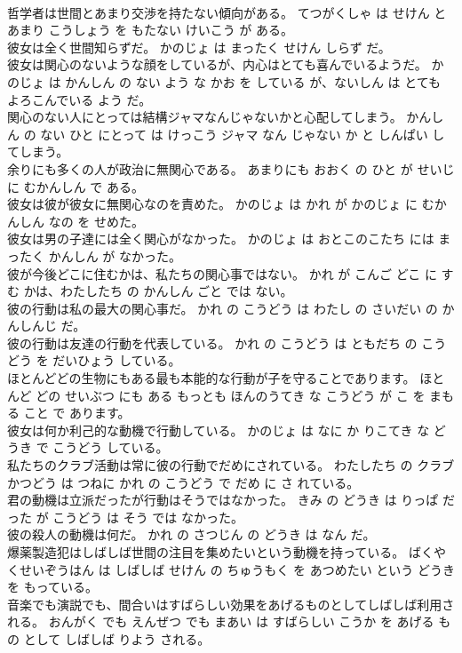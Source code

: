 \documentclass[8pt]{extreport}
\begin{document}
\begin{CJK}{UTF8}{min}
\\	哲学者は世間とあまり交渉を持たない傾向がある。	てつがくしゃ は せけん と あまり こうしょう を もたない けいこう が ある。	
\\	彼女は全く世間知らずだ。	かのじょ は まったく せけん しらず だ。	
\\	彼女は関心のないような顔をしているが、内心はとても喜んでいるようだ。	かのじょ は かんしん の ない よう な かお を している が、ないしん は とても よろこんでいる よう だ。	
\\	関心のない人にとっては結構ジャマなんじゃないかと心配してしまう。	かんしん の ない ひと にとって は けっこう ジャマ なん じゃない か と しんぱい してしまう。	
\\	余りにも多くの人が政治に無関心である。	あまりにも おおく の ひと が せいじ に むかんしん で ある。	
\\	彼女は彼が彼女に無関心なのを責めた。	かのじょ は かれ が かのじょ に むかんしん なの を せめた。	
\\	彼女は男の子達には全く関心がなかった。	かのじょ は おとこのこたち には まったく かんしん が なかった。	
\\	彼が今後どこに住むかは、私たちの関心事ではない。	かれ が こんご どこ に すむ かは、わたしたち の かんしん ごと では ない。	
\\	彼の行動は私の最大の関心事だ。	かれ の こうどう は わたし の さいだい の かんしんじ だ。	
\\	彼の行動は友達の行動を代表している。	かれ の こうどう は ともだち の こうどう を だいひょう している。	
\\	ほとんどどの生物にもある最も本能的な行動が子を守ることであります。	ほとんど どの せいぶつ にも ある もっとも ほんのうてき な こうどう が こ を まもる こと で あります。	
\\	彼女は何か利己的な動機で行動している。	かのじょ は なに か りこてき な どうき で こうどう している。	
\\	私たちのクラブ活動は常に彼の行動でだめにされている。	わたしたち の クラブ かつどう は つねに かれ の こうどう で だめ に さ れている。	
\\	君の動機は立派だったが行動はそうではなかった。	きみ の どうき は りっぱ だった が こうどう は そう では なかった。	
\\	彼の殺人の動機は何だ。	かれ の さつじん の どうき は なん だ。	
\\	爆薬製造犯はしばしば世間の注目を集めたいという動機を持っている。	ばくやくせいぞうはん は しばしば せけん の ちゅうもく を あつめたい という どうき を もっている。	
\\	音楽でも演説でも、間合いはすばらしい効果をあげるものとしてしばしば利用される。	おんがく でも えんぜつ でも まあい は すばらしい こうか を あげる もの として しばしば りよう される。	

\end{CJK}
\end{document}
